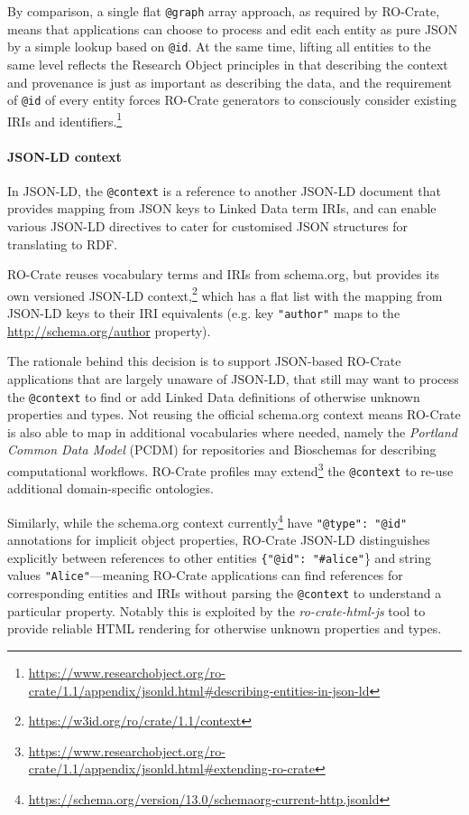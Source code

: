 By comparison, a single flat \texttt{@graph} array approach, as required
by RO-Crate, means that applications can choose to process and edit each
entity as pure JSON by a simple lookup based on \texttt{@id}. At the
same time, lifting all entities to the same level reflects the Research
Object principles
\cite{Bechhofer 2013}
in that describing the context and provenance is just as important as
describing the data, and the requirement of \texttt{@id} of every entity
forces RO-Crate generators to consciously
consider
existing IRIs and identifiers.\footnote{\url{https://www.researchobject.org/ro-crate/1.1/appendix/jsonld.html\#describing-entities-in-json-ld}}

\paragraph{JSON-LD context}\label{ch5:json-ld-context}

In JSON-LD, the \texttt{@context} is a reference to another JSON-LD
document that provides mapping from JSON keys to Linked Data term IRIs,
and can enable various JSON-LD directives to cater for customised JSON
structures for translating to RDF.

RO-Crate reuses vocabulary terms and IRIs from schema.org, but provides
its own versioned JSON-LD
context,\footnote{\url{https://w3id.org/ro/crate/1.1/context}} which has a flat list
with the mapping from JSON-LD keys to their IRI equivalents (e.g. key
\texttt{"author"} maps to the \url{http://schema.org/author} property).

The rationale behind this decision is to support JSON-based RO-Crate
applications that are largely unaware of JSON-LD, that still may want to
process the \texttt{@context} to find or add Linked Data definitions of
otherwise unknown properties and types. Not reusing the official
schema.org context means RO-Crate is also able to map in additional
vocabularies where needed, namely the \emph{Portland Common Data Model}
(PCDM) \cite{Cossu 2018}
for
repositories and Bioschemas \cite{Gray 2017}
for
describing computational workflows. RO-Crate profiles may
extend\footnote{\url{https://www.researchobject.org/ro-crate/1.1/appendix/jsonld.html\#extending-ro-crate}}
the \texttt{@context} to re-use additional domain-specific ontologies.


Similarly, while the schema.org context
currently\footnote{\url{https://schema.org/version/13.0/schemaorg-current-http.jsonld}}
have \texttt{"@type": "@id"} annotations for implicit object properties, RO-Crate
JSON-LD distinguishes explicitly between references to other entities
\texttt{\{"@id": "\#alice"}\}
and string values \texttt{"Alice"}---meaning
RO-Crate applications can find references for corresponding entities
and IRIs without parsing the \texttt{@context} to understand a particular
property. Notably this is exploited by the \textit{ro-crate-html-js}
\cite{ro-crate-html-js} tool to provide reliable HTML rendering for
otherwise unknown properties and types.

